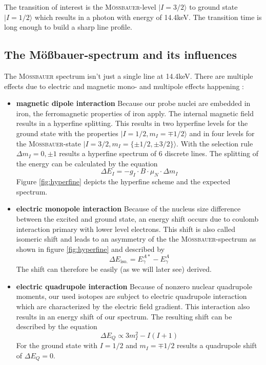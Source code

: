 \documentclass[11pt,a4paper,notitlepage]{scrartcl}
\begin{document}
The transition of interest is the \textsc{Mö\ss bauer}-level $|I=3/2\rangle$ to ground state $|I=1/2\rangle$ which results in a photon with energy of 14.4keV. The transition time is long enough to build a sharp line profile. \cite{schatz}
\subsection{The Mö\ss bauer-spectrum and its influences}\label{sec:spectrum}

The \textsc{Mö\ss bauer} spectrum isn't just a single line at 14.4keV. There are multiple effects due to electric and magnetic mono- and multipole effects happening \cite{chemistry}:
\begin{itemize}
	\item \textbf{magnetic dipole interaction}
	Because our probe nuclei are embedded in iron, the ferromagnetic properties of iron apply. The internal magnetic field results in a hyperfine splitting. This results in two hyperfine levels for the ground state with the properties $|I=1/2,m_I=\mp1/2\rangle$ and in four levels for the \textsc{Mö\ss bauer}-state $|I=3/2,m_I=\{\pm1/2,\pm3/2\}\rangle$. With the selection rule $\Delta m_I=0,\pm 1$ \cite{demroeder4} results a hyperfine spectrum of 6 discrete lines.
	The splitting of the energy can be calculated by the equation 
	\begin{equation}\label{eq:hyperfine}
		\Delta E_I=-g_I\cdot B\cdot \mu_N\cdot \Delta m_I
	\end{equation}
	Figure \ref{fig:hyperfine} depicts the hyperfine scheme and the expected spectrum.
	\item \textbf{electric monopole interaction} Because of the nucleus size difference between the excited and ground state, an energy shift occurs due to coulomb interaction primary with lower level electrons. This shift is also called isomeric shift and leads to an asymmetry of the the \textsc{Mö\ss bauer}-spectrum as shown in figure \ref{fig:hyperfine} and described by \cite{chemistry}
	\begin{equation}
		\Delta E_{\text{iso.}}=E_\gamma^{A*}-E_\gamma^{A}
	\end{equation}
	The shift can therefore be easily (as we will later see) derived. \cite{chemistry}
	\item \textbf{electric quadrupole interaction} Because of nonzero nuclear quadrupole moments, our used isotopes are subject to electric quadrupole interaction which are characterized by the electric field gradient. This interaction also results in an energy shift of our spectrum. The resulting shift can be described by the equation
	\begin{equation}\label{eq:quadrupole}
		\Delta E_Q\propto 3m_I^2-I(I+1)
	\end{equation}
	For the ground state with $I=1/2$ and $m_I=\mp1/2$ results a quadrupole shift of $\Delta E_Q=0$. \cite{chemistry}
\end{itemize}
\end{document}
